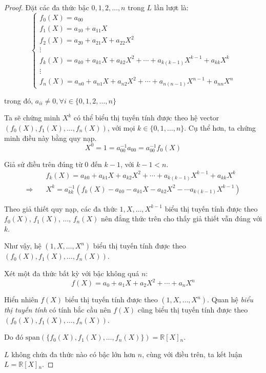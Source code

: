 \documentclass[class=linearalgebra,crop=false]{standalone}
\begin{document}
\begin{proof}Đặt các đa thức bậc $0, 1, 2,\ldots, n$ trong $L$ lần lượt là:
    \[
        \begin{cases}
            f_{0}(X) = a_{00}                                                                    \\
            f_{1}(X) = a_{10} + a_{11}X                                                          \\
            f_{2}(X) = a_{20} + a_{21}X + a_{22}X^{2}                                            \\
            \vdots                                                                               \\
            f_{k}(X) = a_{k0} + a_{k1}X + a_{k2}X^{2} + \cdots + a_{k(k-1)}X^{k-1} + a_{kk}X^{k} \\
            \vdots                                                                               \\
            f_{n}(X) = a_{n0} + a_{n1}X + a_{n2}X^{2} + \cdots + a_{n(n-1)}X^{n-1} + a_{nn}X^{n}
        \end{cases}
    \]
    \par trong đó, $a_{ii}\ne 0, \forall i\in\{0, 1, 2,\ldots, n\}$
    \par Ta sẽ chứng minh $X^{k}$ có thể biểu thị tuyến tính được theo hệ vector $(f_{0}(X), f_{1}(X), \ldots, f_{n}(X))$, với mọi $k\in\{0,1,\ldots, n\}$. Cụ thể hơn, ta chứng minh điều này bằng quy nạp.
    \[ X^{0} = 1 = a^{-1}_{00}a_{00} = a^{-1}_{00}f_{0}(X) \]
    \par Giả sử điều trên đúng từ $0$ đến $k-1$, với $k-1 < n$.
    \begin{align*}
                         & f_{k}(X) = a_{k0} + a_{k1}X + a_{k2}X^{2} + \cdots + a_{k(k-1)}X^{k-1} + a_{kk}X^{k}      \\
        \Rightarrow\quad & X^{k} = a^{-1}_{kk}(f_{k}(X) - a_{k0} - a_{k1}X - a_{k2}X^{2} - \cdots a_{k(k-1)}X^{k-1})
    \end{align*}
    \par Theo giả thiết quy nạp, các đa thức $1, X, \ldots, X^{k-1}$ biểu thị tuyến tính được theo $f_{0}(X)$, $f_{1}(X)$, $\ldots$, $f_{n}(X)$ nên đẳng thức trên cho thấy giả thiết vẫn đúng với $k$.
    \par Như vậy, hệ $(1, X, \ldots, X^{n})$ biểu thị tuyến tính được theo $(f_{0}(X), f_{1}(X), \ldots, f_{n}(X))$.
    \par Xét một đa thức bất kỳ với bậc không quá $n$:
    \[ f(X) = a_{0} + a_{1}X + a_{2}X^{2} + \cdots + a_{n}X^{n} \]
    \par Hiển nhiên $f(X)$ biểu thị tuyến tính được theo $(1, X, \ldots, X^{n})$. Quan hệ \textit{biểu thị tuyến tính} có tính bắc cầu nên $f(X)$ cũng biểu thị tuyến tính được theo $(f_{0}(X), f_{1}(X), \ldots, f_{n}(X))$.
    \par Do đó $\text{span}(\{f_{0}(X), f_{1}(X),\ldots, f_{n}(X)\}) = \mathbb{R}[X]{}_{n}$.
    \par $L$ không chứa đa thức nào có bậc lớn hơn $n$, cùng với điều trên, ta kết luận $L = \mathbb{R}[X]{}_{n}$.
\end{proof}
\end{document}
